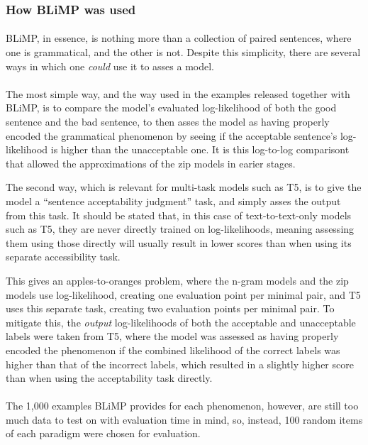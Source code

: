 \documentclass[11pt]{article}
\begin{document}
\subsubsection{How BLiMP was used}
\paragraph{}
BLiMP, in essence, is nothing more than a collection of paired sentences, where one is grammatical, and the other is not. Despite this simplicity, there are several ways in which one \textit{could} use it to asses a model.

\paragraph{}
The most simple way, and the way used in the examples released together with BLiMP, is to compare the model's evaluated log-likelihood of both the good sentence and the bad sentence, to then asses the model as having properly encoded the grammatical phenomenon by seeing if the acceptable sentence's log-likelihood is higher than the unacceptable one. It is this log-to-log comparisont that allowed the approximations of the zip models in earier stages.

The second way, which is relevant for multi-task models such as T5, is to give the model a ``sentence acceptability judgment'' task, and simply asses the output from this task. It should be stated that, in this case of text-to-text-only models such as T5, they are never directly trained on log-likelihoods, meaning assessing them using those directly will usually result in lower scores than when using its separate accessibility task.

This gives an apples-to-oranges problem, where the n-gram models and the zip models use log-likelihood, creating one evaluation point per minimal pair, and T5 uses this separate task, creating two evaluation points per minimal pair. To mitigate this, the \textit{output} log-likelihoods of both the acceptable and unacceptable labels were taken from T5, where the model was assessed as having properly encoded the phenomenon if the combined likelihood of the correct labels was higher than that of the incorrect labels, which resulted in a slightly higher score than when using the acceptability task directly.

\paragraph{}
The 1,000 examples BLiMP provides for each phenomenon, however, are still too much data to test on with evaluation time in mind, so, instead, 100 random items of each paradigm were chosen for evaluation.
\end{document}
